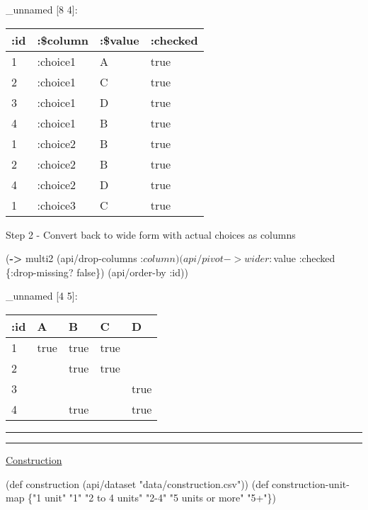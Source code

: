 \documentclass[]{article}
\newenvironment{Shaded}{\begin{snugshade}}{\end{snugshade}}
\newcommand{\KeywordTok}[1]{\textcolor[rgb]{0.13,0.29,0.53}{\textbf{#1}}}
\newcommand{\StringTok}[1]{\textcolor[rgb]{0.31,0.60,0.02}{#1}}
\newcommand{\FunctionTok}[1]{\textcolor[rgb]{0.00,0.00,0.00}{#1}}
\newcommand{\VariableTok}[1]{\textcolor[rgb]{0.00,0.00,0.00}{#1}}
\newcommand{\BuiltInTok}[1]{#1}
\newcommand{\AttributeTok}[1]{\textcolor[rgb]{0.77,0.63,0.00}{#1}}
\newcommand{\NormalTok}[1]{#1}
\begin{document}
\_unnamed {[}8 4{]}:

\begin{longtable}[]{@{}llll@{}}
\toprule
:id & :\$column & :\$value & :checked\tabularnewline
\midrule
\endhead
1 & :choice1 & A & true\tabularnewline
2 & :choice1 & C & true\tabularnewline
3 & :choice1 & D & true\tabularnewline
4 & :choice1 & B & true\tabularnewline
1 & :choice2 & B & true\tabularnewline
2 & :choice2 & B & true\tabularnewline
4 & :choice2 & D & true\tabularnewline
1 & :choice3 & C & true\tabularnewline
\bottomrule
\end{longtable}

Step 2 - Convert back to wide form with actual choices as columns

\begin{Shaded}
\begin{Highlighting}[]
\NormalTok{(}\KeywordTok{->}\NormalTok{ multi2}
\NormalTok{    (api/drop-columns :$column)}
\NormalTok{    (api/pivot->wider :$value }\AttributeTok{:checked}\NormalTok{ \{}\AttributeTok{:drop-missing}\NormalTok{? }\VariableTok{false}\NormalTok{\})}
\NormalTok{    (api/order-by }\AttributeTok{:id}\NormalTok{))}
\end{Highlighting}
\end{Shaded}

\_unnamed {[}4 5{]}:

\begin{longtable}[]{@{}lllll@{}}
\toprule
:id & A & B & C & D\tabularnewline
\midrule
\endhead
1 & true & true & true &\tabularnewline
2 & & true & true &\tabularnewline
3 & & & & true\tabularnewline
4 & & true & & true\tabularnewline
\bottomrule
\end{longtable}

\begin{center}\rule{0.5\linewidth}{0.5pt}\end{center}

\begin{center}\rule{0.5\linewidth}{0.5pt}\end{center}

\href{https://tidyr.tidyverse.org/articles/pivot.html\#by-hand}{Construction}

\begin{Shaded}
\begin{Highlighting}[]
\NormalTok{(}\BuiltInTok{def}\FunctionTok{ construction }\NormalTok{(api/dataset }\StringTok{"data/construction.csv"}\NormalTok{))}
\NormalTok{(}\BuiltInTok{def}\FunctionTok{ construction-unit-map }\NormalTok{\{}\StringTok{"1 unit"} \StringTok{"1"}
                            \StringTok{"2 to 4 units"} \StringTok{"2-4"}
                            \StringTok{"5 units or more"} \StringTok{"5+"}\NormalTok{\})}
\end{Highlighting}
\end{Shaded}
\end{document}
